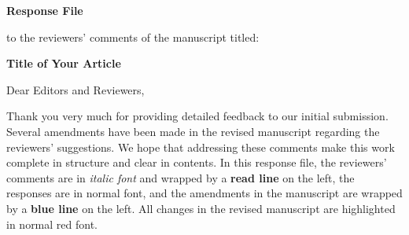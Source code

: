
\begin{spacing}{1.5}

\begin{center}
{\LARGE
\textbf{Response File}
}

to the reviewers' comments of the manuscript titled:

{\large
\textbf{
Title of Your Article
}
}
\end{center}
\end{spacing}
\noindent\hrulefill

\quad\newline
\noindent Dear Editors and Reviewers,

Thank you very much for providing detailed feedback to our initial submission. 
Several amendments have been made in the revised manuscript regarding the reviewers' suggestions. 
We hope that addressing these comments make this work complete in structure and clear in contents. 
In this response file, 
the reviewers' comments are in \textit{italic font} and wrapped by a \textbf{{\color{red}read line}} on the left, 
the responses are in normal font, 
and the amendments in the manuscript are wrapped by a \textbf{{\color{blue}blue line}} on the left. 
All changes in the revised manuscript are highlighted in {\color{red}normal red font}.
